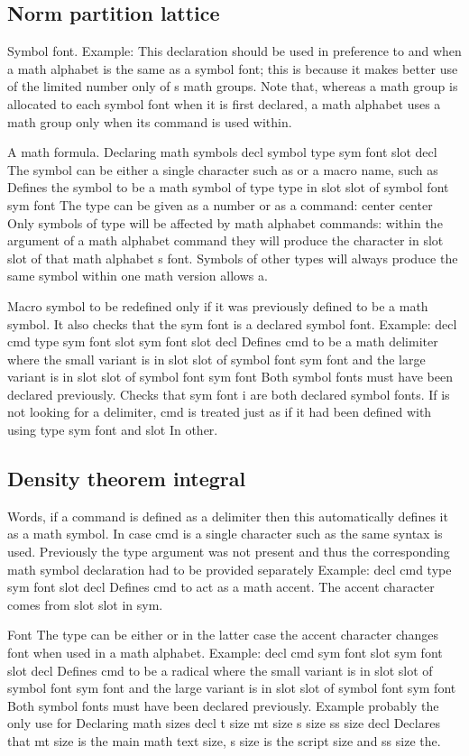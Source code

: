 \documentclass{article}
\begin{document}
\subsection{Norm partition lattice}
Symbol font. Example: This declaration should be used in preference to and when a math alphabet is the same as a symbol font; this is because it makes better use of the limited number only of s math groups. Note that, whereas a math group is allocated to each symbol font when it is first declared, a math alphabet uses a math group only when its command is used within.

A math formula. Declaring math symbols decl symbol type sym font slot decl The symbol can be either a single character such as or a macro name, such as Defines the symbol to be a math symbol of type type in slot slot of symbol font sym font The type can be given as a number or as a command: center center Only symbols of type will be affected by math alphabet commands: within the argument of a math alphabet command they will produce the character in slot slot of that math alphabet s font. Symbols of other types will always produce the same symbol within one math version allows a.

Macro symbol to be redefined only if it was previously defined to be a math symbol. It also checks that the sym font is a declared symbol font. Example: decl cmd type sym font slot sym font slot decl Defines cmd to be a math delimiter where the small variant is in slot slot of symbol font sym font and the large variant is in slot slot of symbol font sym font Both symbol fonts must have been declared previously. Checks that sym font i are both declared symbol fonts. If is not looking for a delimiter, cmd is treated just as if it had been defined with using type sym font and slot In other.

\subsection{Density theorem integral}
Words, if a command is defined as a delimiter then this automatically defines it as a math symbol. In case cmd is a single character such as the same syntax is used. Previously the type argument was not present and thus the corresponding math symbol declaration had to be provided separately Example: decl cmd type sym font slot decl Defines cmd to act as a math accent. The accent character comes from slot slot in sym.

Font The type can be either or in the latter case the accent character changes font when used in a math alphabet. Example: decl cmd sym font slot sym font slot decl Defines cmd to be a radical where the small variant is in slot slot of symbol font sym font and the large variant is in slot slot of symbol font sym font Both symbol fonts must have been declared previously. Example probably the only use for Declaring math sizes decl t size mt size s size ss size decl Declares that mt size is the main math text size, s size is the script size and ss size the.
\end{document}
